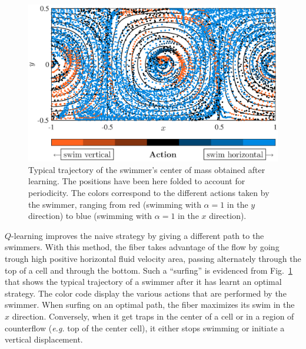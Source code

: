 \documentclass[aps,pre,reprint,superscriptaddress]{revtex4-2}
\begin{document}
\begin{figure}[ht]
  \centerline{\includegraphics[width=\columnwidth]{traj_centerofmass}}
  \caption{\label{fig:traj_centerofmass} Typical trajectory of the swimmer's center of mass obtained after learning. The positions have been here folded to account for periodicity. The colors correspond to the different actions taken by the swimmer, ranging from red (swimming with $\alpha = 1$ in the $y$ direction) to blue (swimming with $\alpha = 1$ in the $x$ direction).}
\end{figure}
$Q$-learning improves the naive strategy by giving a different path to the swimmers. With this method, the fiber takes advantage of the flow by going trough high positive horizontal fluid velocity area, passing alternately through the top of a cell and through the bottom. Such a ``surfing'' is evidenced from Fig.~\ref{fig:traj_centerofmass} that shows the typical trajectory of a swimmer after it has learnt an optimal strategy. The color code display the various actions that are performed by the swimmer. When surfing on an optimal path, the fiber maximizes its swim in the $x$ direction. Conversely, when it get traps in the center of a cell or in a region of counterflow (\textit{e.g.} top of the center cell), it either stops swimming or initiate a vertical displacement.
\end{document}
